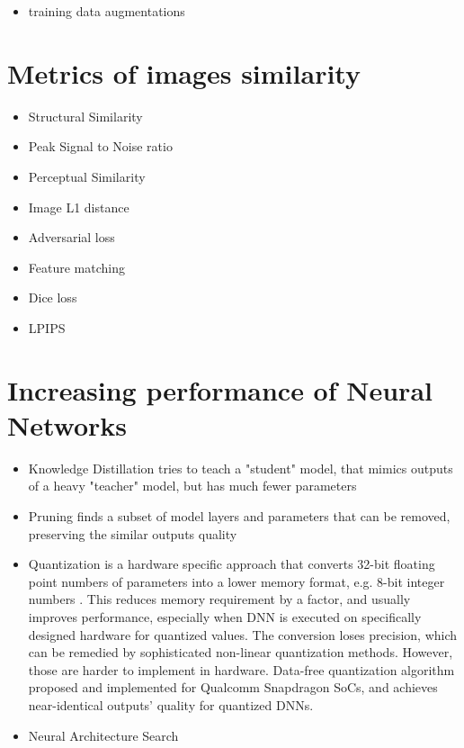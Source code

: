 \begin{itemize}
	\item training data augmentations
	
\end{itemize}

\section{Metrics of images similarity}
\label{lit:metrics}
\begin{itemize}
	\item Structural Similarity
	\item Peak Signal to Noise ratio
	\item Perceptual Similarity
	\item Image L1 distance
	\item Adversarial loss
	\item Feature matching
	\item Dice loss
	\item LPIPS
\end{itemize}

\section{Increasing performance of Neural Networks}
\label{lit:dnn-speedup}
\begin{itemize}
	\item Knowledge Distillation tries to teach a "student" model, that mimics outputs of a heavy "teacher" model, but has much fewer parameters \cite{speed:distillgan19}
	\item Pruning finds a subset of model layers and parameters that can be removed, preserving the similar outputs quality \cite{speed:prunning-gan21}
	\item Quantization is a hardware specific approach that converts 32-bit floating point numbers of parameters into a lower memory format, e.g. 8-bit integer numbers \cite{speed:quant-error-analysis15}. This reduces memory requirement by a factor, and usually improves performance, especially when DNN is executed on specifically designed hardware for quantized values. The conversion loses precision, which can be remedied by sophisticated non-linear quantization methods. However, those are harder to implement in hardware. Data-free quantization \cite{speed:datafreequant19} algorithm proposed and implemented for Qualcomm Snapdragon SoCs, and achieves near-identical outputs' quality for quantized DNNs.  
	\item Neural Architecture Search
\end{itemize}

